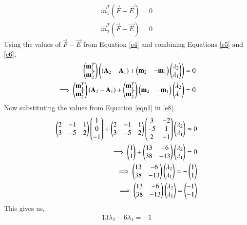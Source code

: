 \documentclass[journal,12pt,twocolumn]{IEEEtran}
\begin{document}
\begin{align}\label{e5}
    \vec{m}_1^T(\vec{F}-\vec{E}) = 0
\end{align}
\begin{align}\label{e6}
    \vec{m}_2^T(\vec{F}-\vec{E}) = 0
\end{align}
Using the values of $\vec{F}-\vec{E}$ from Equation \ref{e4} and combining Equations \ref{e5} and \ref{e6},
\begin{align}\label{e7}
    \begin{pmatrix}\mathbf{m}_1^T \\ \mathbf{m}_2^T\end{pmatrix}\left((\mathbf{A}_2 - \mathbf{A}_1) + \begin{pmatrix}\mathbf{m}_2 & -\mathbf{m}_1\end{pmatrix}\begin{pmatrix}\lambda_2 \\ \lambda_1\end{pmatrix}\right) = 0 \\
    \label{e8} \implies\begin{pmatrix}\mathbf{m}_1^T \\ \mathbf{m}_2^T\end{pmatrix}(\mathbf{A}_2 - \mathbf{A}_1) + \begin{pmatrix}\mathbf{m}_1^T \\ \mathbf{m}_2^T\end{pmatrix}\begin{pmatrix}\mathbf{m}_2 & -\mathbf{m}_1\end{pmatrix}\begin{pmatrix}\lambda_2 \\ \lambda_1\end{pmatrix} = 0
\end{align}
Now substituting the values from Equation \eqref{eqn1} in \eqref{e8}
\begin{align}
    \begin{pmatrix}2 & -1 & 1 \\ 3 & -5 & 2\end{pmatrix}\begin{pmatrix}1\\ 0 \\ -1\end{pmatrix}+\begin{pmatrix}2 & -1 & 1 \\ 3 & -5 & 2\end{pmatrix}\begin{pmatrix}3&-2\\-5&1\\2&-1\end{pmatrix}\begin{pmatrix}\lambda_2 \\ \lambda_1\end{pmatrix} = 0 \\
    \implies\begin{pmatrix}1 \\ 1\end{pmatrix} +\begin{pmatrix}13 & -6 \\ 38 & -13\end{pmatrix}\begin{pmatrix}\lambda_2 \\ \lambda_1\end{pmatrix}= 0 \\
    \implies \begin{pmatrix}13 & -6 \\ 38 & -13\end{pmatrix}\begin{pmatrix}\lambda_2 \\ \lambda_1\end{pmatrix}= -\begin{pmatrix}1 \\ 1\end{pmatrix}\\
    \implies \begin{pmatrix}13 & -6 \\ 38 & -13\end{pmatrix}\begin{pmatrix}\lambda_2 \\ \lambda_1\end{pmatrix}= \begin{pmatrix}-1 \\ -1\end{pmatrix}
\end{align}
This gives us,
\begin{align}\label{e9}
    13\lambda_2 - 6\lambda_1 = -1
\end{align}
\end{document}

